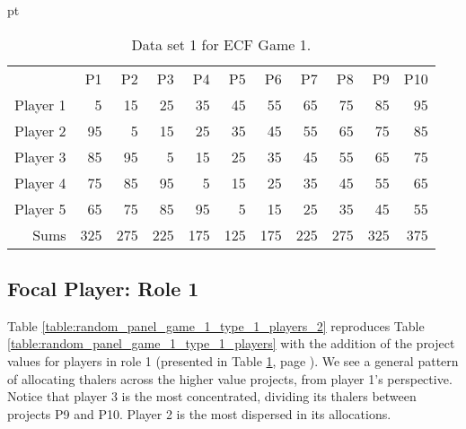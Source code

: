 \documentclass[11pt, oneside]{article}   	%
\begin{document}
 \begin{table}[h]
\figtop
{} pt
\centering
\begin{tabular}{rrrrrrrrrrr}
 & P1 & P2 & P3 & P4 & P5 & P6 & P7 & P8 & P9 & P10 \\ 
  \cline{2-11} 
Player 1 & 5 & 15 & 25 & 35 & 45 & 55 & 65 & 75 & 85 & 95 \\ 
Player 2 & 95 & 5 & 15 & 25 & 35 & 45 & 55 & 65 & 75 & 85 \\ 
Player 3 & 85 & 95 & 5 & 15 & 25 & 35 & 45 & 55 & 65 & 75 \\ 
Player 4 & 75 & 85 & 95 & 5 & 15 & 25 & 35 & 45 & 55 & 65 \\ 
Player 5 & 65 & 75 & 85 & 95 & 5 & 15 & 25 & 35 & 45 & 55 \\  
 \cline{2-11} 
Sums & 325 & 275 & 225 & 175 & 125 & 175 & 225 & 275 & 325 & 375
\end{tabular}
\caption{Data set 1 for ECF Game 1.}
\label{table:ecf_game_1_data}
\figbot
\end{table}



\subsection{Focal Player: Role 1}

Table \ref{table:random_panel_game_1_type_1_players_2} reproduces Table \ref{table:random_panel_game_1_type_1_players}  with the addition of the project values for players in role 1 (presented in Table \ref{table:ecf_game_1_data}, page \pageref{table:ecf_game_1_data}). We see a general pattern of allocating thalers across the higher value projects, from player 1's perspective. Notice that player 3 is the most concentrated, dividing its thalers between projects P9 and P10. Player 2 is the most dispersed in its allocations.
\end{document}
